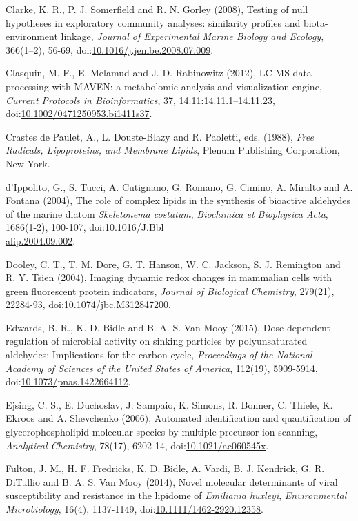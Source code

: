 \begin{singlespace}
{{Clarke, K. R., P. J. Somerfield and R. N. Gorley (2008), Testing of null hypotheses in exploratory community analyses: similarity profiles and biota-environment linkage, \emph{Journal of Experimental Marine Biology and Ecology}, 366(1--2), 56-69, doi:\href{http://dx.doi.org/10.1016/j.jembe.2008.07.009}{10.1016/j.jembe.2008.07.009}.

Clasquin, M. F., E. Melamud and J. D. Rabinowitz (2012), LC-MS data processing with MAVEN: a metabolomic analysis and visualization engine, \emph{Current Protocols in Bioinformatics}, 37, 14.11:14.11.1--14.11.23, doi:\href{http://dx.doi.org/10.1002/0471250953.bi1411s37}{10.1002/0471250953.bi1411s37}.

Crastes de Paulet, A., L. Douste-Blazy and R. Paoletti, eds. (1988), \emph{Free Radicals, Lipoproteins, and Membrane Lipids}, Plenum Publishing Corporation, New York.

d'Ippolito, G., S. Tucci, A. Cutignano, G. Romano, G. Cimino, A. Miralto and A. Fontana (2004), The role of complex lipids in the synthesis of bioactive aldehydes of the marine diatom \emph{Skeletonema costatum}, \emph{Biochimica et Biophysica Acta}, 1686(1-2), 100-107, doi:\href{http://dx.doi.org/10.1016/J.Bblalip.2004.09.002}{10.1016/J.Bbl\\alip.2004.09.002}.

Dooley, C. T., T. M. Dore, G. T. Hanson, W. C. Jackson, S. J. Remington and R. Y. Tsien (2004), Imaging dynamic redox changes in mammalian cells with green fluorescent protein indicators, \emph{Journal of Biological Chemistry}, 279(21), 22284-93, doi:\href{http://dx.doi.org/10.1074/jbc.M312847200}{10.1074/jbc.M312847200}.

Edwards, B. R., K. D. Bidle and B. A. S. Van Mooy (2015), Dose-dependent regulation of microbial activity on sinking particles by polyunsaturated aldehydes: Implications for the carbon cycle, \emph{Proceedings of the National Academy of Sciences of the United States of America}, 112(19), 5909-5914, doi:\href{http://dx.doi.org/10.1073/pnas.1422664112}{10.1073/pnas.1422664112}.

Ejsing, C. S., E. Duchoslav, J. Sampaio, K. Simons, R. Bonner, C. Thiele, K. Ekroos and A. Shevchenko (2006), Automated identification and quantification of glycerophospholipid molecular species by multiple precursor ion scanning, \emph{Analytical Chemistry}, 78(17), 6202-14, doi:\href{http://dx.doi.org/10.1021/ac060545x}{10.1021/ac060545x}.

Fulton, J. M., H. F. Fredricks, K. D. Bidle, A. Vardi, B. J. Kendrick, G. R. DiTullio and B. A. S. Van Mooy (2014), Novel molecular determinants of viral susceptibility and resistance in the lipidome of \emph{Emiliania huxleyi}, \emph{Environmental Microbiology}, 16(4), 1137-1149, doi:\href{http://dx.doi.org/10.1111/1462-2920.12358}{10.1111/1462-2920.12358}.

}}
\end{singlespace}
